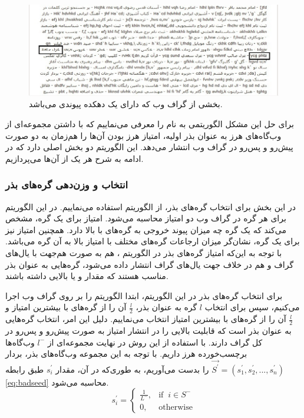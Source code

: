 \documentclass[twoside, a4paper,11pt]{book}
\numberwithin{equation}{chapter}
\numberwithin{table}{chapter}
\numberwithin{figure}{chapter}
\numberwithin{equation}{chapter}
\begin{document}
\begin{figure}
\centering
\includegraphics[scale=0.5]{Figures/linkfarm.png}
\caption{\label{fig:linkfarm}
بخشی از گراف وب که دارای یک دهکده پیوندی می‌باشد.
}
\end{figure}
برای حل این مشکل الگوریتمی به نام  را معرفی می‌نماییم که با داشتن مجموعه‌ای از وب‌گاه‌های هرز به عنوان بذر اولیه، امتیاز هرز بودن آن‌ها را هم‌زمان به دو صورت پیش‌رو و پس‌رو در گراف وب انتشار می‌دهد. این الگوریتم دو بخش اصلی دارد که در ادامه به شرح هر یک از آن‌ها می‌پردازیم.

\subsubsection{انتخاب و وزن‌دهی گره‌های بذر}
در این بخش برای انتخاب گره‌های بذر، از الگوریتم  \cite{kleinberg1999authoritative} استفاده می‌نماییم. در این الگوریتم برای هر گره در گراف وب دو امتیاز محاسبه می‌شود. امتیاز  برای یک گره،  مشخص می‌کند که یک گره چه میزان  پیوند خروجی به گره‌های با  بالا دارد. همچنین امتیاز  نیز برای یک گره، نشان‌گر میزان ارجاعات گره‌های مختلف با امتیاز  بالا به آن گره می‌باشد. با توجه به این‌که امتیاز گره‌های بذر در الگوریتم ، هم به صورت هم‌جهت با یال‌های گراف و هم در خلاف جهت یال‌های گراف انتشار داده می‌شود، گره‌هایی به عنوان بذر مناسب هستند که  مقدار  و یا  بالایی داشته باشند. 

برای انتخاب گره‌های بذر در این الگوریتم، ابتدا الگوریتم  را بر روی گراف وب اجرا می‌کنیم، سپس برای انتخاب $l$ گره به عنوان بذر، $\frac{l}{2}$ آن را از گره‌های با بیشترین امتیاز  و $\frac{l}{2}$ آن را از گره‌های با بیشترین امتیاز  انتخاب می‌نماییم. دلیل این امر، انتخاب گره‌هایی به عنوان بذر است که قابلیت بالایی را در انتشار امتیاز به صورت پیش‌رو و پس‌رو در کل گراف دارند. با استفاده از این روش در نهایت مجموعه‌ای از $l^-$ وب‌گاه‌ها برچسب‌خورده هرز داریم. با توجه به این مجموعه وب‌گاه‌های بذر، بردار $\vec{S^\prime} = (s^\prime_1, s^\prime_2, ..., s^\prime_n)$ را بدست می‌آوریم، به طوری‌که در آن، مقدار  $s^\prime_i$ طبق رابطه \ref{eq:badseed} محاسبه می‌شود.
\begin{equation}
\label{eq:badseed}
  s^\prime_i =\begin{cases}
     \frac{1}{L^-} ,& \text{if} \; \;  i \in S^-\\
    0, & \text{otherwise}
  \end{cases}
\end{equation}
\end{document}
